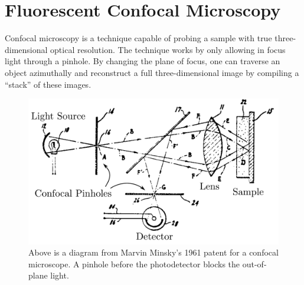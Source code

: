 
\section{Fluorescent Confocal Microscopy} \label{ch:microscopy}
Confocal microscopy is a technique capable of probing a sample with true three-dimensional optical resolution. The technique works by only allowing in focus light through a pinhole. By changing the plane of focus, one can traverse an object azimuthally and reconstruct a full three-dimensional image by compiling a ``stack'' of these images.  

\begin{figure}[h!]
	\centering
	\includegraphics[width=\linewidth]{confocal_stuff/confocalpatent_crop3}
	\caption[Minsky Patent Diagram]{Above is a diagram from Marvin Minsky's 1961 patent \cite{minsky2} for a confocal microscope. A pinhole before the photodetector blocks the out-of-plane light.}
	\label{fig:confocalpatent}
\end{figure}



